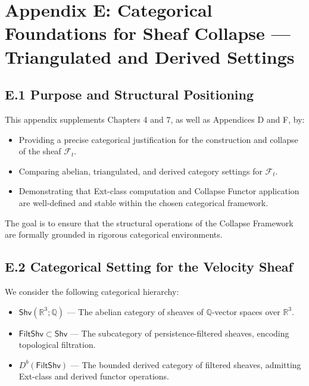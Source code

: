 \documentclass[11pt]{article}
\begin{document}
\section*{Appendix E: Categorical Foundations for Sheaf Collapse — Triangulated and Derived Settings}

\subsection*{E.1 Purpose and Structural Positioning}

This appendix supplements Chapters 4 and 7, as well as Appendices D and F, by:

\begin{itemize}
  \item Providing a precise categorical justification for the construction and collapse of the sheaf \( \mathcal{F}_t \).
  \item Comparing abelian, triangulated, and derived category settings for \( \mathcal{F}_t \).
  \item Demonstrating that Ext-class computation and Collapse Functor application are well-defined and stable within the chosen categorical framework.
\end{itemize}

The goal is to ensure that the structural operations of the Collapse Framework are formally grounded in rigorous categorical environments.

\subsection*{E.2 Categorical Setting for the Velocity Sheaf}

We consider the following categorical hierarchy:

\begin{itemize}
  \item \( \mathsf{Shv}(\mathbb{R}^3; \mathbb{Q}) \) — The abelian category of sheaves of \( \mathbb{Q} \)-vector spaces over \( \mathbb{R}^3 \).
  \item \( \mathsf{FiltShv} \subset \mathsf{Shv} \) — The subcategory of persistence-filtered sheaves, encoding topological filtration.
  \item \( D^b(\mathsf{FiltShv}) \) — The bounded derived category of filtered sheaves, admitting Ext-class and derived functor operations.
\end{itemize}
\end{document}
